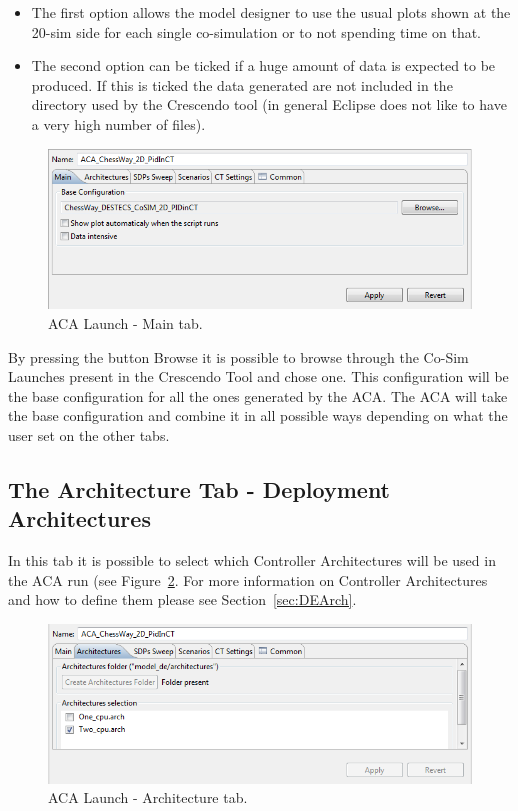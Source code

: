 \documentclass{crescendorepchap}
\begin{document}
\begin{itemize}
\item The first option allows the model designer to use the usual plots shown at the 20-sim side for each single co-simulation or to not spending time on that.
\item The second option can be ticked if a huge amount of data is expected to be produced. If this is ticked the data generated are not included in the directory used by the Crescendo tool (in general Eclipse does not like to have a very high number of files). 
\end{itemize}

\begin{figure}[htbp]
\centering
\includegraphics[width=.6\textwidth]{images/Destecsacamaintab.png}
\caption{ACA Launch - Main tab.\label{fig:Destecsacamaintab}}
\end{figure}

By pressing the button Browse it is
possible to browse through the Co-Sim Launches present in the Crescendo
Tool and chose one. This configuration will be the base configuration
for all the ones generated by the ACA. The ACA will take the base
configuration and combine it in all possible ways depending on what the
user set on the other tabs.

\subsection{The Architecture Tab - Deployment Architectures}

In this tab it is possible to select which Controller Architectures will
be used in the ACA run (see Figure~\ref{fig:ArchitecturesACA}. For more information on Controller Architectures
and how to define them please see Section~\ref{sec:DEArch}.

\begin{figure}[htbp]
\centering
\includegraphics[width=.6\textwidth]{images/ArchitecturesACA.png}
\caption{ACA Launch - Architecture tab.\label{fig:ArchitecturesACA}}
\end{figure}
\end{document}
